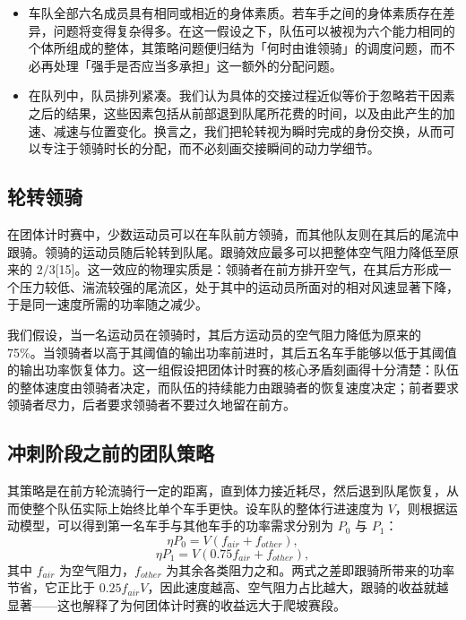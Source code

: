 \documentclass[11pt,a4paper]{ctexart}
\begin{document}
\begin{itemize}
\item 车队全部六名成员具有相同或相近的身体素质。若车手之间的身体素质存在差异，问题将变得复杂得多。在这一假设之下，队伍可以被视为六个能力相同的个体所组成的整体，其策略问题便归结为「何时由谁领骑」的调度问题，而不必再处理「强手是否应当多承担」这一额外的分配问题。
\item 在队列中，队员排列紧凑。我们认为具体的交接过程近似等价于忽略若干因素之后的结果，这些因素包括从前部退到队尾所花费的时间，以及由此产生的加速、减速与位置变化。换言之，我们把轮转视为瞬时完成的身份交换，从而可以专注于领骑时长的分配，而不必刻画交接瞬间的动力学细节。
\end{itemize}

\subsection*{轮转领骑}

在团体计时赛中，少数运动员可以在车队前方领骑，而其他队友则在其后的尾流中跟骑。领骑的运动员随后轮转到队尾。跟骑效应最多可以把整体空气阻力降低至原来的 $2/3$[15]。这一效应的物理实质是：领骑者在前方排开空气，在其后方形成一个压力较低、湍流较强的尾流区，处于其中的运动员所面对的相对风速显著下降，于是同一速度所需的功率随之减少。

我们假设，当一名运动员在领骑时，其后方运动员的空气阻力降低为原来的 75\%。当领骑者以高于其阈值的输出功率前进时，其后五名车手能够以低于其阈值的输出功率恢复体力。这一组假设把团体计时赛的核心矛盾刻画得十分清楚：队伍的整体速度由领骑者决定，而队伍的持续能力由跟骑者的恢复速度决定；前者要求领骑者尽力，后者要求领骑者不要过久地留在前方。

\subsection{冲刺阶段之前的团队策略}

其策略是在前方轮流骑行一定的距离，直到体力接近耗尽，然后退到队尾恢复，从而使整个队伍实际上始终比单个车手更快。设车队的整体行进速度为 $V$，则根据运动模型，可以得到第一名车手与其他车手的功率需求分别为 $P_0$ 与 $P_1$：
\begin{equation}
\eta P_0=V\left(f_{air}+f_{other}\right),
\end{equation}
\begin{equation}
\eta P_1=V\left(0.75f_{air}+f_{other}\right),
\end{equation}
其中 $f_{air}$ 为空气阻力，$f_{other}$ 为其余各类阻力之和。两式之差即跟骑所带来的功率节省，它正比于 $0.25f_{air}V$，因此速度越高、空气阻力占比越大，跟骑的收益就越显著——这也解释了为何团体计时赛的收益远大于爬坡赛段。
\end{document}
